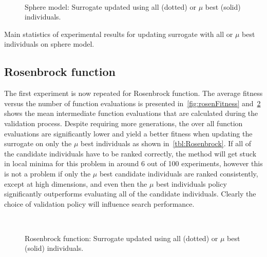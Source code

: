 \begin{figure}
	\label{fig:sphereFitness}
	\,
	\label{fig:sphereIntmEval}
	\caption{Sphere model: Surrogate updated using all (dotted) or $\mu$ best (solid) individuals.}
\end{figure}

\begin{table} \centering
	\caption{Main statistics of experimental results for updating surrogate with all or $\mu$ best individuals on sphere model.}\label{tbl:Sphere}
	
\end{table}

\subsection{Rosenbrock function}\label{sec:rosen}
The first experiment is now repeated for Rosenbrock function.
The average fitness versus the number of function evaluations is presented in~\cref{fig:rosenFitness} and~\cref{fig:rosenIntmEval} shows the mean intermediate function evaluations that are calculated during the validation process. Despite requiring more generations, the over all function evaluations are significantly lower and yield a better fitness when updating the surrogate on only the $\mu$ best individuals as shown in~\cref{tbl:Rosenbrock}. If all of the candidate individuals have to be ranked correctly, the method will get stuck in local minima for this problem in around 6 out of 100 experiments, however this is not a problem if only the $\mu$ best candidate individuals are ranked consistently, except at high dimensions, and even then the $\mu$ best individuals  policy significantly outperforms evaluating all of the candidate individuals. Clearly the choice of validation policy will influence search performance. 

\begin{figure}
	\label{fig:rosenFitness}
	\,
	\label{fig:rosenIntmEval}
	\caption{Rosenbrock function: Surrogate updated using all (dotted) or $\mu$ best (solid) individuals.}
\end{figure}

